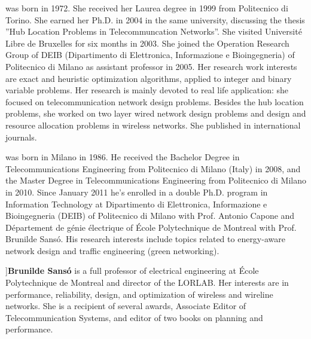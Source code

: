 \documentclass[final,5p,times,twocolumn]{elsarticle}
\begin{document}
 was born in 1972. She received her Laurea degree in 1999 from Politecnico di Torino. She earned her Ph.D. in 2004 in the same university, discussing the thesis ''Hub Location Problems in Telecommuncation Networks''. She visited Universit\'e  Libre de Bruxelles for six months in 2003. She joined the Operation Research Group of DEIB (Dipartimento di Elettronica, Informazione e Bioingegneria) of Politecnico di Milano as assistant professor in 2005. Her research work interests are exact and heuristic optimization algorithms, applied to integer and binary variable problems. Her research is mainly devoted to real life application: she focused on telecommunication network design problems. Besides the hub location problems, she worked on two layer wired network design problems and design and resource allocation problems in wireless networks. She published in international journals.


 was born in Milano in 1986. He received the Bachelor Degree in Telecommunications Engineering from Politecnico di Milano (Italy) in 2008, and the Master Degree in Telecommunications Engineering from Politecnico di Milano in 2010. Since January 2011 he's enrolled in a double Ph.D. program in Information Technology at Dipartimento di Elettronica, Informazione e Bioingegneria (DEIB) of Politecnico di Milano with Prof. Antonio Capone and D\'epartement de g\'enie \'electrique of \'Ecole Polytechnique de Montreal with Prof. Brunilde Sans\'o. His research interests include topics related to energy-aware network design and traffic engineering (green networking).



]{\bf Brunilde Sans\'o} is a full professor of electrical engineering at \'Ecole Polytechnique de Montreal and director of the LORLAB. Her interests are in performance, reliability, design, and optimization of wireless and wireline networks. She is a recipient of several awards, Associate Editor of Telecommunication Systems, and editor of two books on planning and performance.\clearpage{}
\end{document}
